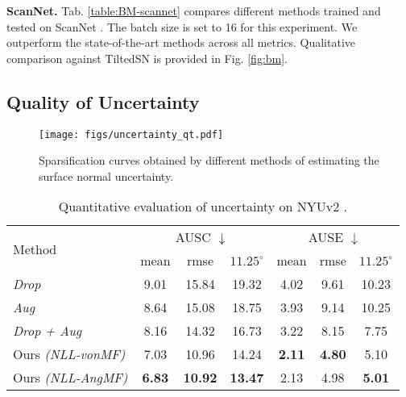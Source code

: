 \documentclass[10pt,twocolumn,letterpaper]{article}
\begin{document}
\noindent
\textbf{ScanNet.} Tab. \ref{table:BM-scannet} compares different methods trained and tested on ScanNet \cite{ScanNet}. The batch size is set to 16 for this experiment. We outperform the state-of-the-art methods across all metrics. Qualitative comparison against TiltedSN \cite{SNfromRGB_20_TiltedSN} is provided in Fig. \ref{fig:bm}.

\subsection{Quality of Uncertainty}

\begin{figure}[t]
\begin{center}
\texttt{[image: figs/uncertainty\_qt.pdf]}
\end{center}
\caption{Sparsification curves obtained by different methods of estimating the surface normal uncertainty.}
\label{fig:roc}
\end{figure}

\begin{table}[t]
\setlength\tabcolsep{1.5pt}
\begin{center}
\begin{tabular}{l|ccc|ccc}
\toprule
\multirow{2}{4em}{Method} & \multicolumn{3}{c|}{\small AUSC $\downarrow$} &
\multicolumn{3}{c}{\small AUSE $\downarrow$}\\
\cline{2-7}
& {\small mean} & {\small rmse} & {\footnotesize $11.25^{\circ}$}
& {\small mean} & {\small rmse} & {\footnotesize $11.25^{\circ}$}\\
\midrule
\textit{Drop} 
& 9.01 & 15.84 & 19.32 & 4.02 & 9.61 & 10.23\\
\textit{Aug} 
& 8.64 & 15.08 & 18.75 & 3.93 & 9.14 & 10.25\\
\textit{Drop + Aug} 
& 8.16 & 14.32 & 16.73 & 3.22 & 8.15 & 7.75\\
\hline
Ours \textit{(NLL-vonMF)} 
& 7.03 & 10.96 & 14.24 & \textbf{2.11} & \textbf{4.80} & 5.10\\
Ours \textit{(NLL-AngMF)} 
& \textbf{6.83} & \textbf{10.92} & \textbf{13.47} & 2.13 & 4.98 & \textbf{5.01}\\
\bottomrule
\end{tabular}
\end{center}
\caption{Quantitative evaluation of uncertainty on NYUv2 \cite{NYUv2}.}
\label{table:uncertainty-nyu}
\end{table}
\end{document}
